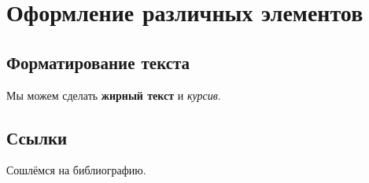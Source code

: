 \documentclass[a4paper,14pt,oneside,openany]{memoir}
\begin{document}



\chapter{Оформление различных элементов} \label{chapt1}

\section{Форматирование текста} \label{sect1_1}


Мы можем сделать \textbf{жирный текст} и \textit{курсив}.


\section{Ссылки} \label{sect1_2}
Сошлёмся на библиографию.
\cite{OlikhJAP,Olikh:Ultras2016}


\end{document}

